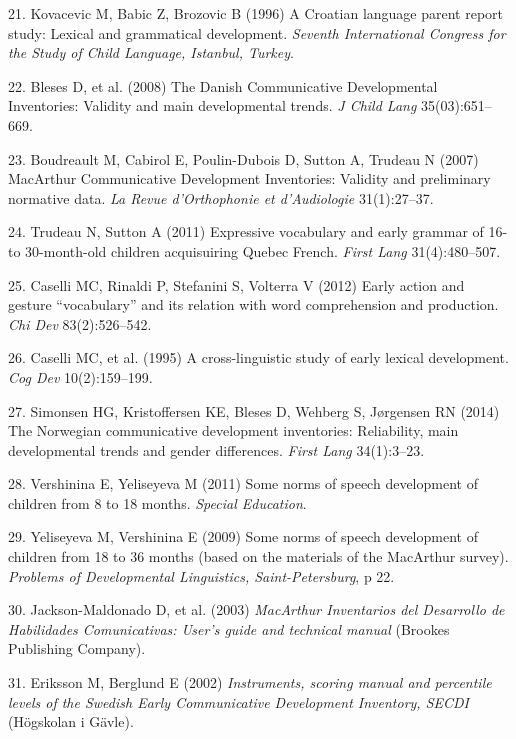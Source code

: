 \documentclass[english,man]{apa6}
\theoremstyle{definition}
\theoremstyle{definition}
\theoremstyle{definition}
\theoremstyle{remark}
\begin{document}
\hypertarget{ref-kovacevic1996}{}
21. Kovacevic M, Babic Z, Brozovic B (1996) A Croatian language parent
report study: Lexical and grammatical development. \emph{Seventh
International Congress for the Study of Child Language, Istanbul,
Turkey}.

\hypertarget{ref-bleses2008}{}
22. Bleses D, et al. (2008) The Danish Communicative Developmental
Inventories: Validity and main developmental trends. \emph{J Child Lang}
35(03):651--669.

\hypertarget{ref-boudreault2007}{}
23. Boudreault M, Cabirol E, Poulin-Dubois D, Sutton A, Trudeau N (2007)
MacArthur Communicative Development Inventories: Validity and
preliminary normative data. \emph{La Revue d'Orthophonie et
d'Audiologie} 31(1):27--37.

\hypertarget{ref-trudeau2011}{}
24. Trudeau N, Sutton A (2011) Expressive vocabulary and early grammar
of 16-to 30-month-old children acquisuiring Quebec French. \emph{First
Lang} 31(4):480--507.

\hypertarget{ref-caselli2012}{}
25. Caselli MC, Rinaldi P, Stefanini S, Volterra V (2012) Early action
and gesture ``vocabulary'' and its relation with word comprehension and
production. \emph{Chi Dev} 83(2):526--542.

\hypertarget{ref-caselli1995}{}
26. Caselli MC, et al. (1995) A cross-linguistic study of early lexical
development. \emph{Cog Dev} 10(2):159--199.

\hypertarget{ref-simonsen2014}{}
27. Simonsen HG, Kristoffersen KE, Bleses D, Wehberg S, Jørgensen RN
(2014) The Norwegian communicative development inventories: Reliability,
main developmental trends and gender differences. \emph{First Lang}
34(1):3--23.

\hypertarget{ref-vershinina2011}{}
28. Vershinina E, Yeliseyeva M (2011) Some norms of speech development
of children from 8 to 18 months. \emph{Special Education}.

\hypertarget{ref-yeliseyeva2009}{}
29. Yeliseyeva M, Vershinina E (2009) Some norms of speech development
of children from 18 to 36 months (based on the materials of the
MacArthur survey). \emph{Problems of Developmental Linguistics,
Saint-Petersburg}, p 22.

\hypertarget{ref-fenson2003}{}
30. Jackson-Maldonado D, et al. (2003) \emph{MacArthur Inventarios del
Desarrollo de Habilidades Comunicativas: User's guide and technical
manual} (Brookes Publishing Company).

\hypertarget{ref-eriksson2002}{}
31. Eriksson M, Berglund E (2002) \emph{Instruments, scoring manual and
percentile levels of the Swedish Early Communicative Development
Inventory, SECDI} (Högskolan i Gävle).
\end{document}
